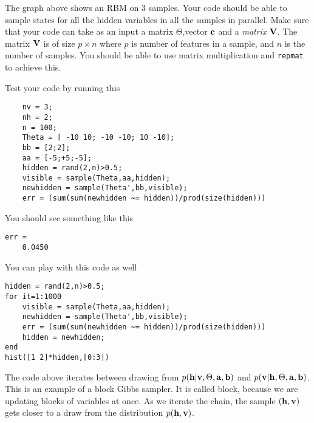 \documentclass{article}
\begin{document}
\begin{center}


\end{center}

The graph above shows an RBM on 3 samples. Your code should be able to sample states for all the hidden variables in all the samples in parallel.
Make sure that your code can take as an input a matrix $\Theta$,vector $\mathbf{c}$ and a {\em matrix} $\mathbf{V}$. The matrix $\mathbf{V}$ is of size $p \times n$ where
$p$ is number of features in a sample, and $n$ is the number of samples. You should be able to use matrix multiplication and \verb|repmat| to achieve this.

Test your code by running this
\begin{verbatim}
    nv = 3;
    nh = 2;
    n = 100;
    Theta = [ -10 10; -10 -10; 10 -10];
    bb = [2;2];
    aa = [-5;+5;-5];
    hidden = rand(2,n)>0.5;
    visible = sample(Theta,aa,hidden);
    newhidden = sample(Theta',bb,visible);
    err = (sum(sum(newhidden ~= hidden))/prod(size(hidden)))
\end{verbatim}
You should see something like this
\begin{verbatim}
err =
    0.0450
\end{verbatim}
You can play with this code as well
\begin{verbatim}
hidden = rand(2,n)>0.5;
for it=1:1000
    visible = sample(Theta,aa,hidden);
    newhidden = sample(Theta',bb,visible);
    err = (sum(sum(newhidden ~= hidden))/prod(size(hidden)))
    hidden = newhidden;
end
hist([1 2]*hidden,[0:3])
\end{verbatim}
The code above iterates between drawing from $p(\mathbf{h}|\mathbf{v},\Theta,\mathbf{a},\mathbf{b})$ and $p(\mathbf{v}|\mathbf{h},\Theta,\mathbf{a},\mathbf{b})$.
This is an example of a block Gibbs sampler. It is called block, because we are updating blocks of variables at once.
As we iterate the chain, the sample $(\mathbf{h},\mathbf{v})$ gets closer to a draw from the distribution $p(\mathbf{h},\mathbf{v})$.
\end{document}
